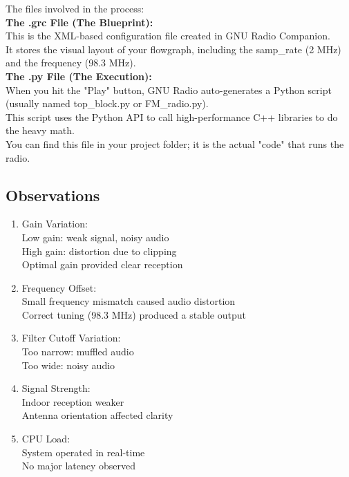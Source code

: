 \documentclass[journal]{IEEEtran}
\begin{document}
The files involved in the process:\\

\textbf{The .grc File (The Blueprint):}\\
This is the XML-based configuration file created in GNU Radio Companion.\\ It stores the visual layout of your flowgraph, including the samp\_rate (2 MHz) and the frequency (98.3 MHz).\\

\textbf{The .py File (The Execution):}\\
When you hit the "Play" button, GNU Radio auto-generates a Python script (usually named top\_block.py or FM\_radio.py).
\\
This script uses the Python API to call high-performance C++ libraries to do the heavy math.
\\
You can find this file in your project folder; it is the actual "code" that runs the radio.
\subsection{Observations}
\begin{enumerate}
\item Gain Variation:\\
        Low gain: weak signal, noisy audio\\
        High gain: distortion due to clipping\\
        Optimal gain provided clear reception\\
\item Frequency Offset:\\
    Small frequency mismatch caused audio distortion\\
Correct tuning (98.3 MHz) produced a stable output\\

\item Filter Cutoff Variation:\\
Too narrow: muffled audio\\
Too wide: noisy audio\\
 \item Signal Strength:\\
Indoor reception weaker\\
Antenna orientation affected clarity\\

\item CPU Load:\\
System operated in real-time\\
No major latency observed
    \end{enumerate}
\end{document}
